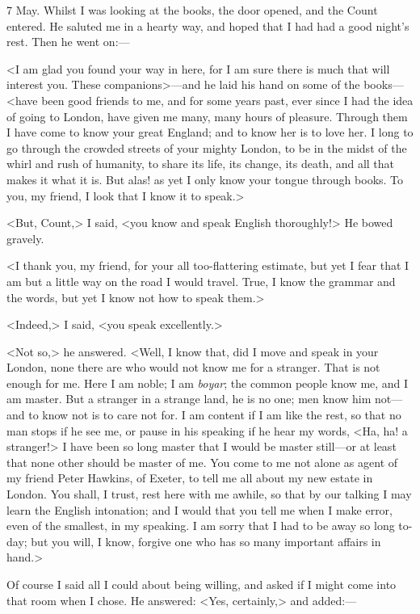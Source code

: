 \begin{diary}{7 May.}
Whilst I was looking at the books, the door opened, and the Count entered. He saluted me in a hearty way, and hoped that I had had a good night's rest. Then he went on:—

<I am glad you found your way in here, for I am sure there is much that will interest you. These companions>—and he laid his hand on some of the books—<have been good friends to me, and for some years past, ever since I had the idea of going to London, have given me many, many hours of pleasure. Through them I have come to know your great England; and to know her is to love her. I long to go through the crowded streets of your mighty London, to be in the midst of the whirl and rush of humanity, to share its life, its change, its death, and all that makes it what it is. But alas! as yet I only know your tongue through books. To you, my friend, I look that I know it to speak.>

<But, Count,> I said, <you know and speak English thoroughly!> He bowed gravely.

<I thank you, my friend, for your all too-flattering estimate, but yet I fear that I am but a little way on the road I would travel. True, I know the grammar and the words, but yet I know not how to speak them.>

<Indeed,> I said, <you speak excellently.>

<Not so,> he answered. <Well, I know that, did I move and speak in your London, none there are who would not know me for a stranger. That is not enough for me. Here I am noble; I am \textit{boyar}; the common people know me, and I am master. But a stranger in a strange land, he is no one; men know him not—and to know not is to care not for. I am content if I am like the rest, so that no man stops if he see me, or pause in his speaking if he hear my words, <Ha, ha! a stranger!> I have been so long master that I would be master still—or at least that none other should be master of me. You come to me not alone as agent of my friend Peter Hawkins, of Exeter, to tell me all about my new estate in London. You shall, I trust, rest here with me awhile, so that by our talking I may learn the English intonation; and I would that you tell me when I make error, even of the smallest, in my speaking. I am sorry that I had to be away so long to-day; but you will, I know, forgive one who has so many important affairs in hand.>

Of course I said all I could about being willing, and asked if I might come into that room when I chose. He answered: <Yes, certainly,> and added:—


\end{diary}
